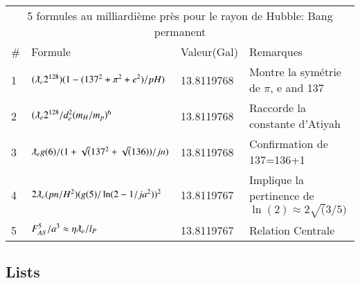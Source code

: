 \documentclass[a4paper,9pt]{article}
\begin{document}
\begin{table*}
  \hskip-2.0cm\begin{tabular}{llll}
    \toprule
    \multicolumn{4}{c}{5 formules au milliardi\`{e}me pr\`{e}s pour le rayon de Hubble: Bang permanent}                   \\
    \cmidrule(r){1-4}
   \#     & Formule     & Valeur(Gal) & Remarques \\
    \midrule
    1 & $(\lambdabar_{e} 2^{128})(1-(137^2+\pi^2+e^2)/pH)$ & 13.8119768  & Montre la sym\'{e}trie de $\pi$, e and 137 \\
    2 & $(\lambdabar_{e} 2^{128}/d_e^2(m_H/m_p)^6$ & 13.8119768  & Raccorde la constante d'Atiyah \\
    3 & $\lambdabar_e g(6)/(1+\sqrt(137^2+\sqrt(136))/jn)$ & 13.8119768 & Confirmation de 137=136+1 \\
    4 & $2\lambdabar_{e} (pn/H^{2})(g(5)/\ln(2-1/ja^2))^2$ & 13.8119767  & Implique la pertinence de $\ln(2) \approx 2\sqrt(3/5)$  \\    
    5 & $F_{AS}^5/a^3 \approx \eta \lambdabar_{e}/l_P$ & 13.8119767  & Relation Centrale  \\
    \bottomrule
  \end{tabular}
  \label{tab:table}
\end{table*}


\subsection{Lists}



  
\end{document}
